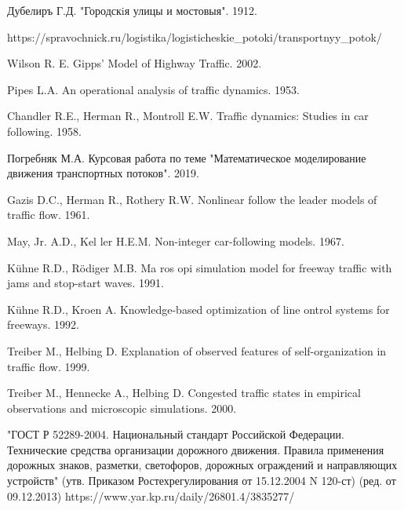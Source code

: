 \documentclass[12pt, a4paper]{extarticle}
\numberwithin{equation}{section}
\begin{document}
\begin{thebibliography}{**}
	Дубелиръ Г.Д. "Городскiя улицы и мостовыя". 1912.
	
	https://spravochnick.ru/logistika/logisticheskie\_potoki/transportnyy\_potok/
	
	Wilson R. E. Gipps’ Model of Highway Traffic. 2002.
	
	Pipes L.A. An operational analysis of traffic dynamics. 1953. 
	
	Chandler R.E., Herman R., Montroll E.W. Traffic dynamics: Studies in car following. 1958.
	
	Погребняк М.А. Курсовая работа по теме "Математическое моделирование движения транспортных потоков". 2019.
	
	Gazis D.C., Herman R., Rothery R.W. Nonlinear follow the leader models of traffic
flow. 1961.

	
	May, Jr. A.D., Kel ler H.E.M. Non-integer car-following models. 1967.
	
	K\"{u}hne R.D., R\"{o}diger M.B. Ma
ros
opi
 simulation model for freeway traffic with jams
	and stop-start waves. 1991.
	
	K\"{u}hne R.D., Kroen A. Knowledge-based optimization of line 
ontrol systems for freeways. 1992.

	Treiber M., Helbing D. Explanation of observed features of self-organization in traffic
flow.
	1999.
	
	Treiber M., Hennecke A., Helbing D. Congested traffic states in empirical observations and
	microscopic simulations. 2000.

	"ГОСТ Р 52289-2004. Национальный стандарт Российской Федерации. Технические средства организации дорожного движения. Правила применения дорожных знаков, разметки, светофоров, дорожных ограждений и направляющих устройств" (утв. Приказом Ростехрегулирования от 15.12.2004 N 120-ст) (ред. от 09.12.2013)
	https://www.yar.kp.ru/daily/26801.4/3835277/
\end{thebibliography}
\end{document}
